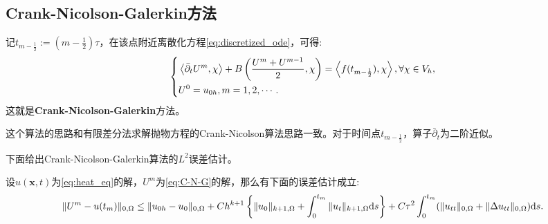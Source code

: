 \subsection{Crank-Nicolson-Galerkin方法}
记$t_{m-\frac{1}{2}}:=(m-\frac{1}{2})\tau$，在该点附近离散化方程\eqref{eq:discretized_ode}，可得:
\begin{equation}
    \label{eq:C-N-G}
    \left\{
        \begin{aligned}
        &\left<\bar{\partial}_{t}U^{m},\chi\right>+B\left(\frac{U^{m}+U^{m-1}}{2},\chi\right)=\left<f(t_{m-\frac{1}{2}}),\chi\right>,\forall \chi\in V_{h},\\
        &U^{0}=u_{0h},m=1,2,\cdots.\\
        \end{aligned}
    \right.
\end{equation}
这就是\textbf{Crank-Nicolson-Galerkin}方法。

\begin{remark}
    这个算法的思路和有限差分法求解抛物方程的Crank-Nicolson算法思路一致。对于时间点$t_{m-\frac{1}{2}}$，算子$\bar{\partial}_{t}$为二阶近似。
\end{remark}

下面给出Crank-Nicolson-Galerkin算法的$L^{2}$误差估计。
\begin{theorem}
    设$u(\mathbf{x},t)$为\eqref{eq:heat_eq}的解，$U^{m}$为\eqref{eq:C-N-G}的解，那么有下面的误差估计成立:
    \begin{equation}
        \|U^{m}-u(t_{m})\|_{0,\Omega}\le \|u_{0h}-u_{0}\|_{0,\Omega}+Ch^{k+1}\left\{\|u_{0}\|_{k+1,\Omega}+\int_{0}^{t_{m}}\|u_{t}\|_{k+1,\Omega}\mathrm{d} s\right\}+C\tau^{2}\int_{0}^{t_{m}}(\|u_{tt}\|_{0,\Omega}+\|\Delta u_{tt}\|_{0,\Omega})\mathrm{d} s.
    \end{equation}
\end{theorem}